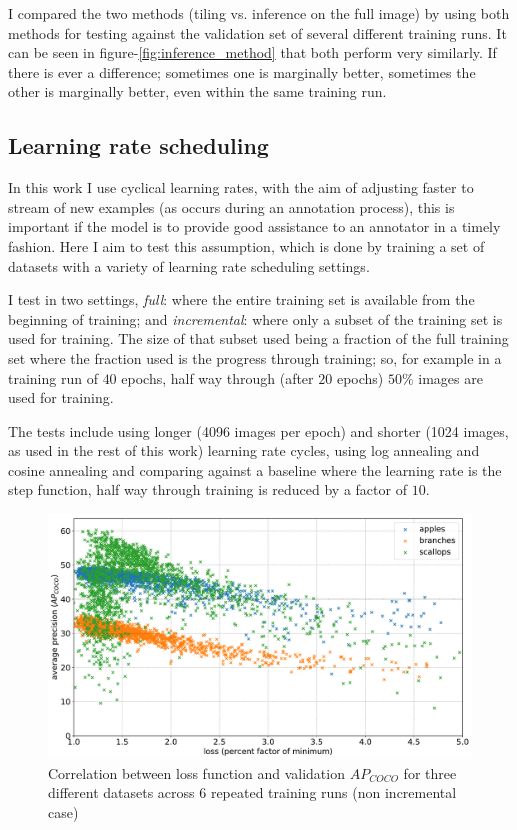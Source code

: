 I compared the two methods (tiling vs. inference on the full image) by using both methods for testing against the validation set of several different training runs. It can be seen in figure-\ref{fig:inference_method} that both perform very similarly. If there is ever a difference; sometimes one is marginally better, sometimes the other is marginally better, even within the same training run.


\subsection {Learning rate scheduling}
\label{sec:lr_schedule_exp}

In this work I use cyclical learning rates, with the aim of adjusting faster to stream of new examples (as occurs during an annotation process), this is important if the model is to provide good assistance to an annotator in a timely fashion. Here I aim to test this assumption, which is done by training a set of datasets with a variety of learning rate scheduling settings. 

I test in two settings, \emph{full}: where the entire training set is available from the beginning of training; and \emph{incremental}: where only a subset of the training set is used for training. The size of that subset used being a fraction of the full training set where the fraction used is the progress through training; so, for example in a training run of $40$ epochs, half way through (after $20$ epochs) $50\%$ images are used for training. 

The tests include using longer (4096 images per epoch) and shorter (1024 images, as used in the rest of this work) learning rate cycles, using log annealing and cosine annealing and comparing against a baseline where the learning rate is the step function, half way through training is reduced by a factor of $10$.

\begin{figure}[h]
  \centering
  \includegraphics[width=1.0\linewidth]{charts/training/lr_schedule/scatter_loss_ap.pdf}
  \caption{Correlation between loss function and validation $AP_{COCO}$ for three different datasets across 6 repeated training runs (non incremental case)}  \label{fig:scatter_loss_ap}
\end{figure}

